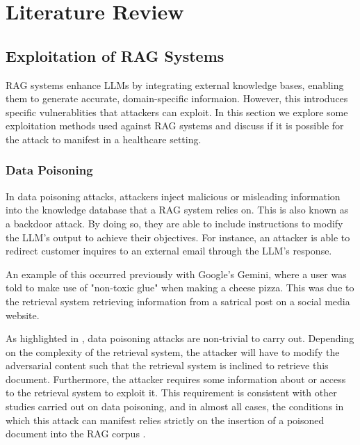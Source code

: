 \chapter{Literature Review} \label {literature}

\section{Exploitation of RAG Systems}

RAG systems enhance LLMs by integrating external knowledge bases, enabling them to generate accurate, domain-specific informaion. However, this introduces specific vulnerablities that attackers can exploit. In this section we explore some exploitation methods used against RAG systems and discuss if it is possible for the attack to manifest in a healthcare setting.

\subsection{Data Poisoning}
In data poisoning attacks, attackers inject malicious or misleading information into the knowledge database that a RAG system relies on. This is also known as a backdoor attack.
By doing so, they are able to include instructions to modify the LLM's output to achieve their objectives. For instance, an attacker is able to redirect customer inquires to an external email through the LLM's response.

An example of this occurred previously with Google's Gemini, where a user was told to make use of "non-toxic glue" when making a cheese pizza. This was due to the retrieval system retrieving information from a satrical post on a social media website.

As highlighted in \autocite{tan2024gluepizzaeatrocks}, data poisoning attacks are non-trivial to carry out.
Depending on the complexity of the retrieval system, the attacker will have to modify the adversarial content such that the retrieval system is inclined to retrieve this document.
Furthermore, the attacker requires some information about or access to the retrieval system to exploit it.
This requirement is consistent with other studies carried out on data poisoning, and in almost all cases, the conditions in which this attack can manifest relies strictly on the insertion of a poisoned document into the RAG corpus \autocite{xue2024badragidentifyingvulnerabilitiesretrieval, tan2024gluepizzaeatrocks, xian2024vulnerabilityapplyingretrievalaugmentedgeneration}.

